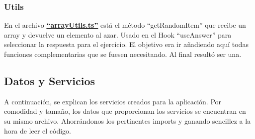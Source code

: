 \documentclass[12pt,twoside,titlepage]{report}
\begin{document}
\subsubsection{Utils}
En el archivo \href{https://github.com/alberttogoca/EarFit/blob/main/src/utils/arrayUtils.ts}{\textbf{``arrayUtils.ts''}} está el método ``getRandomItem'' que recibe un array y devuelve un elemento al azar. Usado en el Hook ``useAnswer'' para seleccionar la respuesta para el ejercicio. El objetivo era ir añadiendo aquí todas funciones complementarias que se fuesen necesitando. Al final resultó ser una.

\subsection{Datos y Servicios}
\label{sec:datos}
\label{sec:servicios}

A continuación, se explican los servicios creados para la aplicación. Por comodidad y tamaño, los datos que proporcionan los servicios se encuentran en su mismo archivo. Ahorrándonos los pertinentes imports y ganando sencillez a la hora de leer el código.

\end{document}
